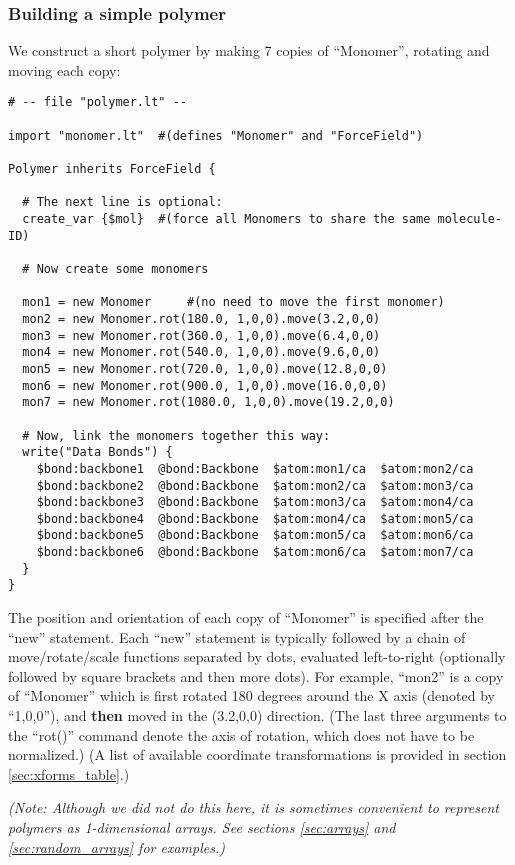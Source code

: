 \documentclass[11pt]{article}
\begin{document}
\subsubsection*{Building a simple polymer}
We construct a short polymer by making 7 copies of ``Monomer'',
rotating and moving each copy:
\label{sec:2beadPolymer}
\begin{verbatim}
# -- file "polymer.lt" --

import "monomer.lt"  #(defines "Monomer" and "ForceField")

Polymer inherits ForceField {

  # The next line is optional:
  create_var {$mol}  #(force all Monomers to share the same molecule-ID)

  # Now create some monomers

  mon1 = new Monomer     #(no need to move the first monomer)
  mon2 = new Monomer.rot(180.0, 1,0,0).move(3.2,0,0)
  mon3 = new Monomer.rot(360.0, 1,0,0).move(6.4,0,0)
  mon4 = new Monomer.rot(540.0, 1,0,0).move(9.6,0,0)
  mon5 = new Monomer.rot(720.0, 1,0,0).move(12.8,0,0)
  mon6 = new Monomer.rot(900.0, 1,0,0).move(16.0,0,0)
  mon7 = new Monomer.rot(1080.0, 1,0,0).move(19.2,0,0)

  # Now, link the monomers together this way:
  write("Data Bonds") {
    $bond:backbone1  @bond:Backbone  $atom:mon1/ca  $atom:mon2/ca
    $bond:backbone2  @bond:Backbone  $atom:mon2/ca  $atom:mon3/ca
    $bond:backbone3  @bond:Backbone  $atom:mon3/ca  $atom:mon4/ca
    $bond:backbone4  @bond:Backbone  $atom:mon4/ca  $atom:mon5/ca
    $bond:backbone5  @bond:Backbone  $atom:mon5/ca  $atom:mon6/ca
    $bond:backbone6  @bond:Backbone  $atom:mon6/ca  $atom:mon7/ca
  }
}
\end{verbatim}
The position and orientation of each copy of ``Monomer'' 
is specified after the ``new'' statement. 
Each ``new'' statement is typically followed by a chain of 
move/rotate/scale functions separated by dots, evaluated left-to-right
(optionally followed by square brackets and then more dots). 
For example, ``mon2'' is a copy of ``Monomer'' which is first rotated 
180 degrees around the X axis (denoted by ``1,0,0''), 
and \textbf{then} moved in the (3.2,0,0) direction.
(The last three arguments to the ``rot()'' command 
 denote the axis of rotation, which does not have to be normalized.)
(A list of available coordinate transformations 
is provided in section \ref{sec:xforms_table}.)

\textit{(Note: Although we did not do this here, 
it is sometimes convenient to represent polymers as 1-dimensional arrays. 
See sections \ref{sec:arrays} and \ref{sec:random_arrays} for examples.)}
\end{document}
